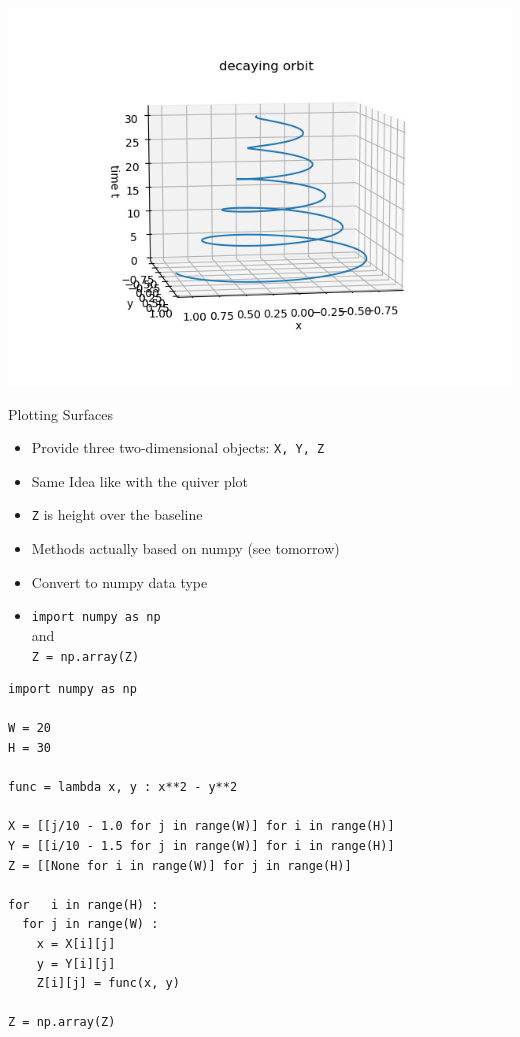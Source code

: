 
\begin{frame}
%
\begin{tcolorbox}[title=Axis Labels]
\begin{center}
	\includegraphics[width=.7\linewidth]{./gfx/plt-orbit3D}
\end{center}
\end{tcolorbox}
%
\end{frame}


\begin{frame}{Plotting Surfaces}
%
\begin{itemize}
\item Provide three two-dimensional objects: \texttt{X, Y, Z}
\item Same Idea like with the quiver plot
\item \texttt{Z} is height over the baseline
\item Methods actually based on numpy (see tomorrow)
\item[\Thus] Convert to numpy data type
\item 
	\texttt{import numpy as np}\\
	and\\
	\texttt{Z = np.array(Z)}
\end{itemize}
%
\end{frame}


\begin{frame}[fragile]
%
\begin{codebox}
\begin{verbatim}
import numpy as np

W = 20
H = 30

func = lambda x, y : x**2 - y**2

X = [[j/10 - 1.0 for j in range(W)] for i in range(H)]
Y = [[i/10 - 1.5 for j in range(W)] for i in range(H)]
Z = [[None for i in range(W)] for j in range(H)]

for   i in range(H) :
  for j in range(W) :
    x = X[i][j]
    y = Y[i][j]
    Z[i][j] = func(x, y)

Z = np.array(Z)
\end{verbatim}
\end{codebox}
%
\end{frame}

